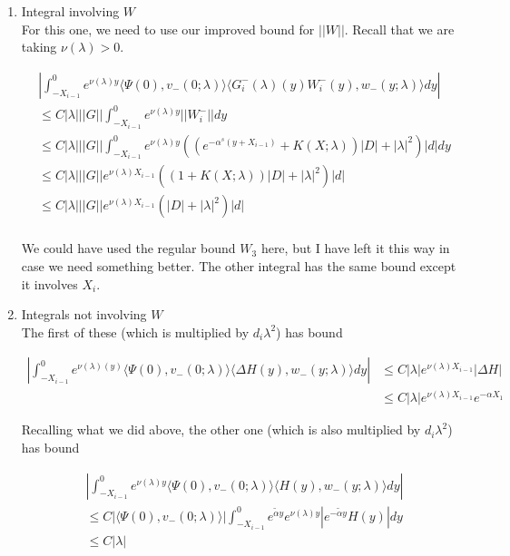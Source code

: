 \documentclass[12pt]{article}
\begin{document}
\begin{enumerate}
\begin{enumerate}

\item Integral involving $W$ \\

For this one, we need to use our improved bound for $||W||$. Recall that we are taking $\nu(\lambda) > 0$.

\begin{align*}
&\left| \int_{-X_{i-1}}^0
e^{\nu(\lambda)y} \langle \Psi(0), v_-(0; \lambda) \rangle \langle G_i^-(\lambda)(y)W_i^-(y), w_-(y; \lambda) \rangle dy \right| \\
&\leq C |\lambda| ||G|| \int_{-X_{i-1}}^0 e^{\nu(\lambda)y} ||W_i^-|| dy \\
&\leq C |\lambda| ||G|| \int_{-X_{i-1}}^0 e^{\nu(\lambda)y} ( (e^{-\alpha^s(y + X_{i-1})} + K(X; \lambda))|D| + |\lambda|^2 )|d| dy \\
&\leq C |\lambda| ||G|| e^{\nu(\lambda)X_{i-1}} (( 1 + K(X; \lambda))|D| + |\lambda|^2 )|d| \\
&\leq C |\lambda| ||G|| e^{\nu(\lambda)X_{i-1}} (|D| + |\lambda|^2 )|d| \\
\end{align*}

We could have used the regular bound $W_3$ here, but I have left it this way in case we need something better. The other integral has the same bound except it involves $X_i$.

\item Integrals not involving $W$ \\

The first of these (which is multiplied by $d_i \lambda^2$) has bound

\begin{align*}
\left| \int_{-X_{i-1}}^0
e^{\nu(\lambda)(y)} \langle \Psi(0), v_-(0; \lambda) \rangle \langle \Delta H(y), w_-(y; \lambda) \rangle dy \right| 
&\leq C |\lambda| e^{\nu(\lambda)X_{i-1}} |\Delta H| \\
&\leq C |\lambda| e^{\nu(\lambda)X_{i-1}} e^{-\alpha X_1}
\end{align*}

Recalling what we did above, the other one (which is also multiplied by $d_i \lambda^2$) has bound

\begin{align*}
&\left| \int_{-X_{i-1}}^0 e^{\nu(\lambda)y} \langle \Psi(0), v_-(0; \lambda) \rangle
\langle H(y), w_-(y; \lambda) \rangle dy \right| \\
&\leq C |\langle \Psi(0), v_-(0; \lambda) \rangle| \int_{-X_{i-1}}^0 e^{\tilde{\alpha}y}e^{\nu(\lambda)y} | e^{-\tilde{\alpha} y} H(y)|dy\\
&\leq C |\lambda| 
\end{align*}


\end{enumerate}
\end{enumerate}
\end{document}
